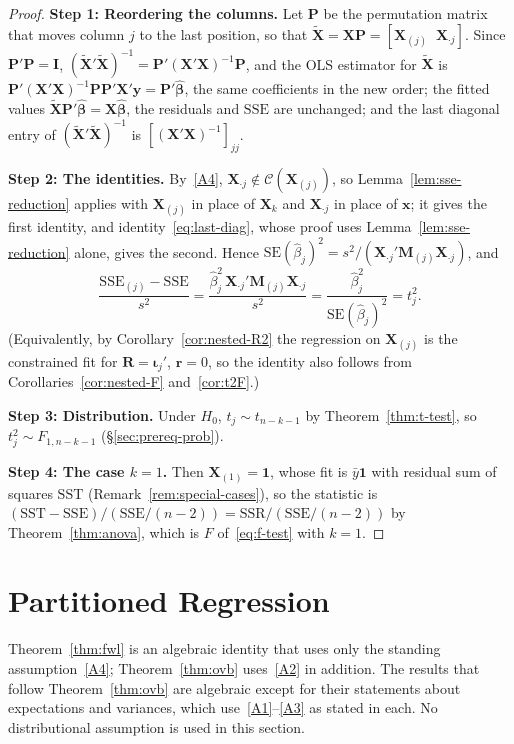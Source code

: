 \documentclass[14pt]{extarticle}
\theoremstyle{plain}
\theoremstyle{definition}
\theoremstyle{remark}
\newcommand{\SST}{\mathrm{SST}}
\newcommand{\SSR}{\mathrm{SSR}}
\newcommand{\SSE}{\mathrm{SSE}}
\newcommand{\SE}{\mathrm{SE}}
\newcommand{\bX}{\mathbf{X}}
\newcommand{\by}{\mathbf{y}}
\newcommand{\bx}{\mathbf{x}}
\def\bb{\boldsymbol{\beta}}
\newcommand{\bI}{\mathbf{I}}
\newcommand{\bM}{\mathbf{M}}
\newcommand{\bR}{\mathbf{R}}
\newcommand{\br}{\mathbf{r}}
\newcommand{\bone}{\mathbf{1}}
\newcommand{\bP}{\mathbf{P}}
\newcommand{\calC}{\mathcal{C}}
\begin{document}
\begin{proof}
\textbf{Step 1: Reordering the columns.} Let $\bP$ be the permutation matrix that moves column $j$ to the last position, so that $\tilde{\bX} = \bX\bP = [\bX_{(j)} \;\; \bX_{\cdot j}]$. Since $\bP'\bP = \bI$, $(\tilde{\bX}'\tilde{\bX})^{-1} = \bP'(\bX'\bX)^{-1}\bP$, and the OLS estimator for $\tilde{\bX}$ is $\bP'(\bX'\bX)^{-1}\bP\bP'\bX'\by = \bP'\hat{\bb}$, the same coefficients in the new order; the fitted values $\tilde{\bX}\bP'\hat{\bb} = \bX\hat{\bb}$, the residuals and $\SSE$ are unchanged; and the last diagonal entry of $(\tilde{\bX}'\tilde{\bX})^{-1}$ is $[(\bX'\bX)^{-1}]_{jj}$.

\textbf{Step 2: The identities.} By~\ref{A4}, $\bX_{\cdot j} \notin \calC(\bX_{(j)})$, so Lemma~\ref{lem:sse-reduction} applies with $\bX_{(j)}$ in place of $\bX_k$ and $\bX_{\cdot j}$ in place of $\bx$; it gives the first identity, and identity~\eqref{eq:last-diag}, whose proof uses Lemma~\ref{lem:sse-reduction} alone, gives the second. Hence $\SE(\hat\beta_j)^2 = s^2/(\bX_{\cdot j}'\bM_{(j)}\bX_{\cdot j})$, and
\[
\frac{\SSE_{(j)} - \SSE}{s^2} = \frac{\hat\beta_j^2\,\bX_{\cdot j}'\bM_{(j)}\bX_{\cdot j}}{s^2} = \frac{\hat\beta_j^2}{\SE(\hat\beta_j)^2} = t_j^2.
\]
(Equivalently, by Corollary~\ref{cor:nested-R2} the regression on $\bX_{(j)}$ is the constrained fit for $\bR = \boldsymbol\iota_j'$, $\br = 0$, so the identity also follows from Corollaries~\ref{cor:nested-F} and~\ref{cor:t2F}.)

\textbf{Step 3: Distribution.} Under $H_0$, $t_j \sim t_{n-k-1}$ by Theorem~\ref{thm:t-test}, so $t_j^2 \sim F_{1,n-k-1}$ (\S\ref{sec:prereq-prob}).

\textbf{Step 4: The case $k = 1$.} Then $\bX_{(1)} = \bone$, whose fit is $\bar y\bone$ with residual sum of squares $\SST$ (Remark~\ref{rem:special-cases}), so the statistic is $(\SST - \SSE)/(\SSE/(n-2)) = \SSR/(\SSE/(n-2))$ by Theorem~\ref{thm:anova}, which is $F$ of~\eqref{eq:f-test} with $k = 1$.
\end{proof}

\section{Partitioned Regression}\label{sec:fwl}

Theorem~\ref{thm:fwl} is an algebraic identity that uses only the standing assumption~\ref{A4}; Theorem~\ref{thm:ovb} uses~\ref{A2} in addition. The results that follow Theorem~\ref{thm:ovb} are algebraic except for their statements about expectations and variances, which use~\ref{A1}--\ref{A3} as stated in each. No distributional assumption is used in this section.
\end{document}
